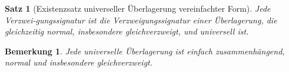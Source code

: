 \documentclass[12pt,a4paper]{article}
\theoremstyle{plain}
\newtheorem{Satz}[Theorem]{Satz}
\newtheorem{Bemerkung}[Theorem]{Bemerkung}
\numberwithin{equation}{section}
\begin{document}
\begin{Satz}[Existenzsatz universeller Überlagerung vereinfachter Form] Jede Verzwei-\linebreak\-gungs\-sig\-na\-tur ist die Verzweigungssignatur einer Überlagerung, die gleichzeitig normal, insbesondere gleichverzweigt, und universell ist.
\end{Satz}
\begin{Bemerkung}
Jede universelle Überlagerung ist einfach zusammenhängend, normal und insbesondere gleichverzweigt.
\end{Bemerkung}
\end{document}

